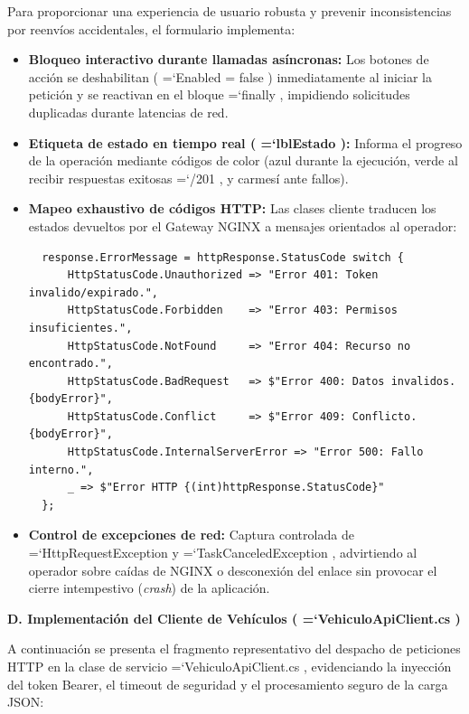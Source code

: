 \documentclass[11pt,a4paper]{article}
\renewcommand{\_}{\oldunderscore\allowbreak}
\DeclareRobustCommand{\texttt}[1]{%
  {\upshape\ttfamily\fontsize{9}{10.8}\selectfont\hyphenchar\font=`\-\relax #1}%
}
\begin{document}
\noindent Para proporcionar una experiencia de usuario robusta y prevenir inconsistencias por reenvíos accidentales, el formulario implementa:
\begin{itemize}[leftmargin=*,itemsep=2pt,topsep=1pt]
  \item \textbf{Bloqueo interactivo durante llamadas asíncronas:} Los botones de acción se deshabilitan (\texttt{Enabled = false}) inmediatamente al iniciar la petición y se reactivan en el bloque \texttt{finally}, impidiendo solicitudes duplicadas durante latencias de red.
  \item \textbf{Etiqueta de estado en tiempo real (\texttt{lblEstado}):} Informa el progreso de la operación mediante códigos de color (azul durante la ejecución, verde al recibir respuestas exitosas \texttt{200/201}, y carmesí ante fallos).
  \item \textbf{Mapeo exhaustivo de códigos HTTP:} Las clases cliente traducen los estados devueltos por el Gateway NGINX a mensajes orientados al operador:
  {\small
  \begin{lstlisting}
  response.ErrorMessage = httpResponse.StatusCode switch {
      HttpStatusCode.Unauthorized => "Error 401: Token invalido/expirado.",
      HttpStatusCode.Forbidden    => "Error 403: Permisos insuficientes.",
      HttpStatusCode.NotFound     => "Error 404: Recurso no encontrado.",
      HttpStatusCode.BadRequest   => $"Error 400: Datos invalidos. {bodyError}",
      HttpStatusCode.Conflict     => $"Error 409: Conflicto. {bodyError}",
      HttpStatusCode.InternalServerError => "Error 500: Fallo interno.",
      _ => $"Error HTTP {(int)httpResponse.StatusCode}"
  };
  \end{lstlisting}
  }
  \item \textbf{Control de excepciones de red:} Captura controlada de \texttt{HttpRequestException} y \texttt{TaskCanceledException}, advirtiendo al operador sobre caídas de NGINX o desconexión del enlace sin provocar el cierre intempestivo (\textit{crash}) de la aplicación.
\end{itemize}

\vspace{0.2cm}
\noindent\textbf{D. Implementación del Cliente de Vehículos (\texttt{VehiculoApiClient.\allowbreak{}cs})}

\noindent A continuación se presenta el fragmento representativo del despacho de peticiones HTTP en la clase de servicio \texttt{VehiculoApiClient.\allowbreak{}cs}, evidenciando la inyección del token Bearer, el timeout de seguridad y el procesamiento seguro de la carga JSON:
\end{document}
